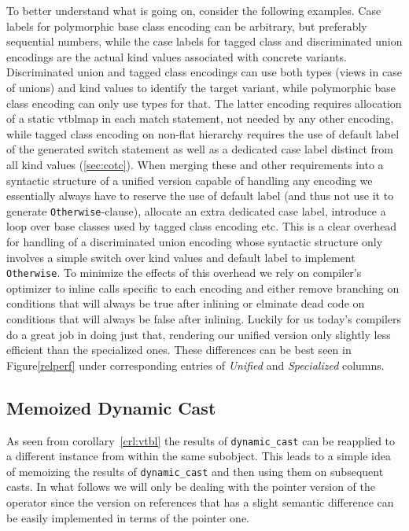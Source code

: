 \documentclass[preprint]{sigplanconf}
\makeatletter
\DeclareRobustCommand{\code}[1]{{\lstinline[breaklines=false,escapechar=@]{#1}}}
\makeatother
\begin{document}
To better understand what is going on, consider the following examples. Case 
labels for polymorphic base class encoding can be arbitrary, but preferably 
sequential numbers, while the case labels for tagged class and discriminated 
union encodings are the actual kind values associated with concrete variants.
Discriminated union and tagged class encodings can use both types (views in case
of unions) and kind values to identify the target variant, while polymorphic 
base class encoding can only use types for that. The latter encoding requires 
allocation of a static vtblmap in each match statement, not needed by any other 
encoding, while tagged class encoding on non-flat hierarchy requires the use of 
default label of the generated switch statement as well as a dedicated case 
label distinct from all kind values (\textsection\ref{sec:cotc}). 
When merging these and other requirements into a syntactic structure of a 
unified version capable of handling any encoding we essentially always have to 
reserve the use of default label (and thus not use it to generate 
\code{Otherwise}-clause), allocate an extra dedicated case label, introduce  
a loop over base classes used by tagged class encoding etc. This is a clear 
overhead for handling of a discriminated union encoding whose syntactic 
structure only involves a simple switch over kind values and default label to 
implement \code{Otherwise}. To minimize the effects of this overhead we rely on 
compiler's optimizer to inline calls specific to each encoding and either remove 
branching on conditions that will always be true after inlining or elminate dead 
code on conditions that will always be false after inlining. Luckily for us 
today's compilers do a great job in doing just that, rendering our unified 
version only slightly less efficient than the specialized ones. These 
differences can be best seen in Figure\ref{relperf} under corresponding entries 
of \emph{Unified} and \emph{Specialized} columns.

\subsection{Memoized Dynamic Cast}
\label{sec:memcast}

As seen from corollary~\ref{crl:vtbl} the results of \code{dynamic_cast} can be 
reapplied to a different instance from within the same subobject. This leads to 
a simple idea of memoizing the results of \code{dynamic_cast} and then using 
them on subsequent casts. In what follows we will only be dealing with the 
pointer version of the operator since the version on references that has a 
slight semantic difference can be easily implemented in terms of the pointer one.
\end{document}
